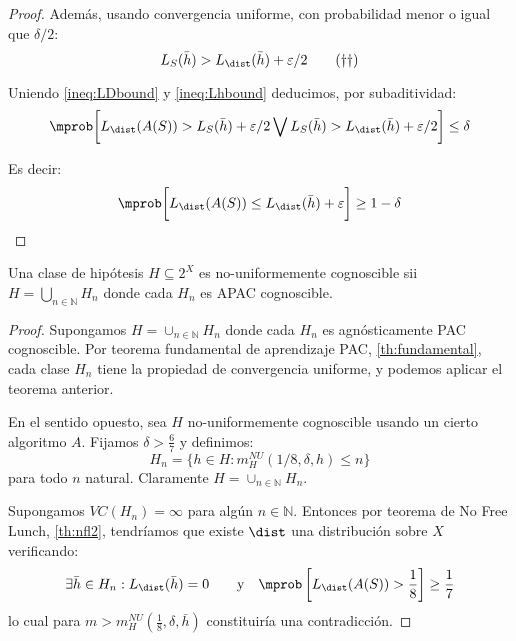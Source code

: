 \begin{proof}
   Además, usando convergencia uniforme, con probabilidad menor o igual que $\delta/2$:
   \begin{equation}
     L_S(\bar{h}) > L_{\dist}(\bar{h}) + \varepsilon/2
     \label{ineq:Lhbound}\tag{\textrm{$\dagger$$\dagger$}}
   \end{equation}

   Uniendo \eqref{ineq:LDbound} y \eqref{ineq:Lhbound} deducimos, por subaditividad:
   \[
     \mprob \bigg[L_{\dist}(A(S)) > L_{S}(\bar{h}) + \varepsilon/2 \bigvee L_S(\bar{h}) > L_{\dist}(\bar{h}) + \varepsilon/2\bigg] \le \delta
   \]
   
   Es decir:
   \[
     \mprob \bigg[L_{\dist}(A(S)) \le L_{\dist}(\bar{h}) + \varepsilon \bigg] \ge 1 - \delta
   \]
  \end{proof}

\begin{theorem}
Una clase de hipótesis $H \subseteq 2^X$ es no-uniformemente cognoscible sii $H = \bigcup_{n\in\mathbb{N}} H_n$ donde
cada $H_n$ es APAC cognoscible.
\end{theorem}
  \begin{proof}
   Supongamos $H = \cup_{n\in \mathbb{N}} H_n$ donde cada $H_n$ es agnósticamente PAC 
   cognoscible. Por teorema fundamental de aprendizaje PAC, \ref{th:fundamental}, cada clase $H_n$ tiene la propiedad de 
   convergencia uniforme, y podemos aplicar el teorema anterior.

   En el sentido opuesto, sea $H$ no-uniformemente cognoscible usando un cierto algoritmo $A$. Fijamos $\delta > \frac{6}{7}$ y
   definimos:
   \[
     H_n = \{h \in H : m_{H}^{NU}(1/8, \delta, h) \le n\}
   \]
   para todo $n$ natural. Claramente $H = \cup_{n\in \mathbb{N}} H_n$. 
   
   Supongamos $VC(H_n) = \infty$ para algún $n\in \mathbb{N}$. Entonces por teorema de No Free Lunch, \ref{th:nfl2}, 
   tendríamos que existe $\dist$ una distribución sobre $X$ verificando:
   \[
     \exists \bar{h}\in H_n: L_{\dist}(\bar{h}) = 0 \qquad\textrm{y}\quad \mprob \left[ L_{\dist}(A(S)) > \frac{1}{8} \right] \ge \frac{1}{7}
   \]
   lo cual para $m > m_H^{NU}(\frac{1}{8}, \delta, \bar{h})$ constituiría una contradicción.
  \end{proof}
  
